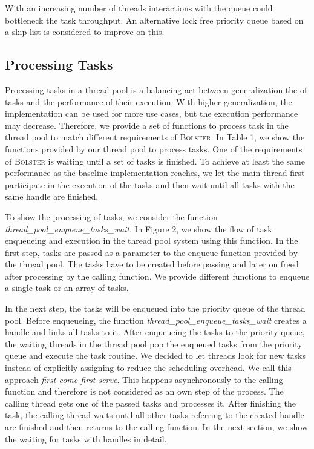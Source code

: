 \documentclass[conference]{IEEEtran}
\begin{document}
With an increasing number of threads interactions with the queue could bottleneck the task throughput. An alternative lock free priority queue \cite{it:2018-003} based on a skip list is considered to improve on this.
\subsection{Processing Tasks}
Processing tasks in a thread pool is a balancing act between generalization the of tasks and the performance of their execution. With higher generalization, the implementation can be used for more use cases, but the execution performance may decrease. Therefore, we provide a set of functions to process task in the thread pool to match different requirements of \textsc{Bolster}. In Table 1, we show the functions provided by our thread pool to process tasks. One of the requirements of \textsc{Bolster} is waiting until a set of tasks is finished. To achieve at least the same performance as the baseline implementation reaches, we let the main thread first participate in the execution of the tasks and then wait until all tasks with the same handle are finished.

To show the processing of tasks, we consider the function \emph{thread\_pool\_enqueue\_tasks\_wait}. In Figure 2, we show the flow of task enqueueing and execution in the thread pool system using this function. In the first step, tasks are passed as a parameter to the enqueue function provided by the thread pool. The tasks have to be created before passing and later on freed after processing by the calling function.  We provide different functions to enqueue a single task or an array of tasks.

In the next step, the tasks will be enqueued into the priority queue of the thread pool. Before enqueueing, the function \emph{thread\_pool\_enqueue\_tasks\_wait} creates a handle and links all tasks to it. After enqueueing the tasks to the priority queue, the waiting threads in the thread pool pop the enqueued tasks from the priority queue and execute the task routine. We decided to let threads look for new tasks instead of explicitly assigning to reduce the scheduling overhead. We call this approach \emph{first come first serve}. This happens asynchronously to the calling function and therefore is not considered as an own step of the process. The calling thread gets one of the passed tasks and processes it. After finishing the task, the calling thread waits until all other tasks referring to the created handle are finished and then returns to the calling function. In the next section, we show the waiting for tasks with handles in detail.
\end{document}
